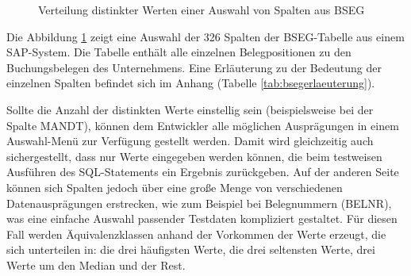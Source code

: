

\begin{figure}[ht]
\centering
	\caption{Verteilung distinkter Werten einer Auswahl von Spalten aus BSEG}
	\label{fig:bseg}
\end{figure}

Die Abbildung \ref{fig:bseg} zeigt eine Auswahl der 326 Spalten der BSEG-Tabelle aus einem SAP-System.
Die Tabelle enthält alle einzelnen Belegpositionen zu den Buchungsbelegen des Unternehmens.
Eine Erläuterung zu der Bedeutung der einzelnen Spalten befindet sich im Anhang (Tabelle \ref{tab:bsegerlaeuterung}).

Sollte die Anzahl der distinkten Werte einstellig sein (beispielsweise bei der Spalte MANDT), können dem Entwickler alle möglichen Ausprägungen in einem Auswahl-Menü zur Verfügung gestellt werden.
Damit wird gleichzeitig auch sichergestellt, dass nur Werte eingegeben werden können, die beim testweisen Ausführen des SQL-Statements ein Ergebnis zurückgeben.
Auf der anderen Seite können sich Spalten jedoch über eine große Menge von verschiedenen Datenausprägungen erstrecken, wie zum Beispiel bei Belegnummern (BELNR), was eine einfache Auswahl passender Testdaten kompliziert gestaltet.
Für diesen Fall werden Äquivalenzklassen anhand der Vorkommen der Werte erzeugt, die sich unterteilen in: die drei häufigsten Werte, die drei seltensten Werte, drei Werte um den Median und der Rest.

